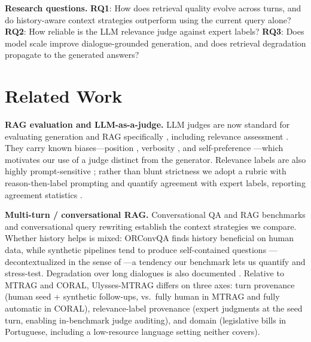 \documentclass[conference]{IEEEtran}
\begin{document}
\noindent\textbf{Research questions.}
\textbf{RQ1}: How does retrieval quality evolve across turns, and do history-aware
context strategies outperform using the current query alone?
\textbf{RQ2}: How reliable is the LLM relevance judge against expert labels?
\textbf{RQ3}: Does model scale improve dialogue-grounded generation, and does
retrieval degradation propagate to the generated answers?

\section{Related Work}
\textbf{RAG evaluation and LLM-as-a-judge.} LLM judges are now standard for
evaluating generation \cite{Zheng2023MTBench,Liu2023GEval,Kim2024Prometheus2} and
RAG specifically \cite{Es2024RAGAS}, including relevance assessment
\cite{Thomas2024Searcher,Upadhyay2024UMBRELA,Faggioli2023Perspectives}. They carry
known biases---position \cite{Wang2024Unfair}, verbosity \cite{Zheng2023MTBench},
and self-preference \cite{Panickssery2024SelfPref}---which motivates our use of a
judge distinct from the generator. Relevance labels are also highly prompt-sensitive
\cite{Arabzadeh2025Prompt}; rather than blunt strictness we adopt a rubric with
reason-then-label prompting \cite{Liu2023GEval} and quantify agreement with expert
labels, reporting agreement statistics
\cite{Calderon2025AltTest,Hashemi2024LLMRubric}.

\textbf{Multi-turn / conversational RAG.} Conversational QA and RAG benchmarks
\cite{Katsis2025MTRAG,Cheng2025CORAL,Qu2020ORConvQA} and conversational query
rewriting \cite{Anantha2021QReCC,Elgohary2019CANARD,Mao2023LLM4CS} establish the
context strategies we compare. Whether history helps is mixed: ORConvQA
\cite{Qu2020ORConvQA} finds history beneficial on human data, while synthetic
pipelines tend to produce self-contained questions \cite{Vlachos2025Synthetic}---%
decontextualized in the sense of \cite{Choi2021Decontextualization}---a tendency
our benchmark lets us quantify and stress-test. Degradation over long dialogues is also
documented \cite{Laban2025Lost}. Relative to MTRAG and CORAL, Ulysses-MTRAG differs
on three axes: turn provenance (human seed + synthetic follow-ups, vs.\ fully human
in MTRAG and fully automatic in CORAL), relevance-label provenance (expert judgments
at the seed turn, enabling in-benchmark judge auditing), and domain (legislative
bills in Portuguese, including a low-resource language setting neither covers).
\end{document}
